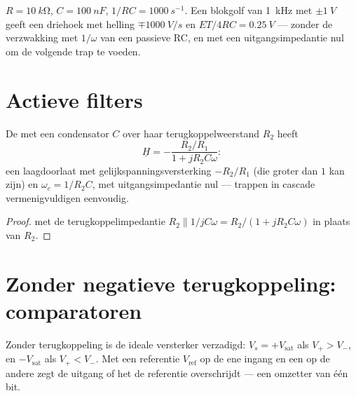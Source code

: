 \begin{example}\label{ex:b1:operational-amplifier:triangle}
$R = \qty{10}{k\ohm}$, $C = \qty{100}{nF}$, $1/RC = \qty{1000}{s^{-1}}$.
Een blokgolf van \qty{1}{kHz} met $\pm\qty{1}{V}$ geeft een driehoek met helling
$\mp\qty{1000}{V/s}$ en  $ET/4RC = \qty{0.25}{V}$ --- zonder
de verzwakking met $1/\omega$ van een passieve RC, en met een uitgangsimpedantie
nul om de volgende trap te voeden.
\end{example}

\section{Actieve filters}

\begin{proposition}\label{prop:b1:operational-amplifier:activelp}
De  met een condensator $C$ over haar
terugkoppelweerstand $R_2$ heeft
\[
\underline H = -\frac{R_2/R_1}{1 + jR_2C\omega}:
\]
een laagdoorlaat met gelijkspanningsversterking $-R_2/R_1$ (die groter dan $1$ kan zijn) en 
$\omega_c = 1/R_2C$, met uitgangsimpedantie nul --- trappen in cascade
vermenigvuldigen eenvoudig.
\end{proposition}

\begin{proof}
 met de terugkoppelimpedantie $R_2 \parallel 1/jC\omega
= R_2/(1 + jR_2C\omega)$ in plaats van $R_2$.
\end{proof}

\section{Zonder negatieve terugkoppeling: comparatoren}

\begin{proposition}[Comparator]\label{prop:b1:operational-amplifier:comparator}
Zonder terugkoppeling is de ideale versterker verzadigd:
$V_s = +V_{\mathrm{sat}}$ als $V_+ > V_-$, en $-V_{\mathrm{sat}}$ als
$V_+ < V_-$. Met een referentie $V_{\mathrm{ref}}$ op de ene ingang en een
 op de andere zegt de uitgang of het  de referentie
overschrijdt --- een omzetter van één bit.
\end{proposition}

